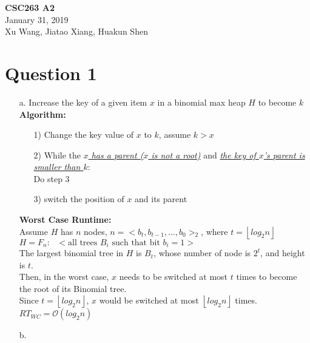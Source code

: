 \documentclass[11pt]{article}
\begin{document}
\noindent \textbf{CSC263 A2}\\
January 31, 2019\\
Xu Wang, Jiatao Xiang, Huakun Shen
\section*{Question 1}
\begin{enumerate}
\item[a.] Increase the key of a given item $x$ in a binomial max heap $H$ to
become $k$\\
\textbf{Algorithm:}
\begin{enumerate}
\item[1)]Change the key value of $x$ to $k$, assume $k>x$
\item[2)]While the \underline{\textit{$x$ has a parent ($x$ is not a root)}} and \underline{\textit{the key of $x$'s parent is smaller than $k$}}:\\
Do step 3
\item[3)]switch the position of $x$ and its parent
\end{enumerate}
\textbf{Worst Case Runtime:}\\
Assume $H$ has $n$ nodes, $n=<b_t,b_{t-1},...,b_0>_2$,		where $t=\left\lfloor log_2n\right\rfloor$\\
$H=F_n:\text{ }<\text{all trees } B_i \text{ such that bit }b_i = 1>$\\
The largest binomial tree in $H$ is $B_t$, whose number of node is $2^t$, and height is $t$.\\
Then, in the worst case, $x$ needs to be switched at most $t$ times to become the root of its Binomial tree.\\
Since $t=\left\lfloor log_2n\right\rfloor$, $x$ would be switched at most $\left\lfloor log_2n\right\rfloor$ times.\\
$RT_{WC}=\mathcal{O}(log_2n)$



\item[b.]
\end{enumerate}
\end{document}
